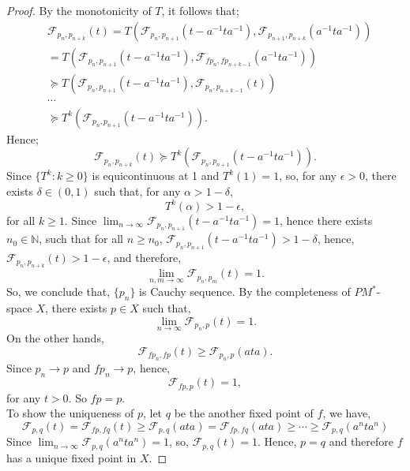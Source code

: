 \documentclass[10pt,a4paper]{amsart}
\begin{document}
\begin{proof}
	By the monotonicity of $T$, it follows that;
	\begin{align*}
		&\mathcal{F}_{p_{n},p_{n+k}}(t)=T\left( \mathcal{F}_{p_{n},p_{n+1}}(t-a^{-1}ta^{-1}), \mathcal{F}_{p_{n+1},p_{n+k}}(a^{-1}ta^{-1})\right) \\
		&=T\left( \mathcal{F}_{p_{n},p_{n+1}}(t-a^{-1}ta^{-1}), \mathcal{F}_{fp_{n},fp_{n+k-1}}(a^{-1}ta^{-1})\right) \\
		& \succeq T\left( \mathcal{F}_{p_{n},p_{n+1}}(t-a^{-1}ta^{-1}), \mathcal{F}_{p_{n},p_{n+k-1}}(t)\right) \\
		&\cdots\\
		& \succeq T^k\left( \mathcal{F}_{p_{n},p_{n+1}}(t-a^{-1}ta^{-1})\right).
	\end{align*}
	Hence;
	$$\mathcal{F}_{p_{n},p_{n+k}}(t)\succeq T^k\left( \mathcal{F}_{p_{n},p_{n+1}}(t-a^{-1}ta^{-1})\right).$$
	Since $\{T^k: k\geq0\}$ is equicontinuous at 1 and $T^k(1)=1$, so, for any $\epsilon>0$, there exists $\delta \in (0,1)$ such that, for any $\alpha> 1-\delta$,
	$$T^k(\alpha)>1-\epsilon,$$
	for all $k\geq 1$. Since $\lim_{n\to\infty}\mathcal{F}_{p_{n},p_{n+1}}(t-a^{-1}ta^{-1})=1$, hence there exists $n_0\in \mathbb{N}$, such that for all $n\geq n_0$, 
	$\mathcal{F}_{p_{n},p_{n+1}}(t-a^{-1}ta^{-1})>1-\delta$, hence, $\mathcal{F}_{p_{n},p_{n+k}}(t)>1-\epsilon$, and therefore,
	$$\lim_{n,m\to \infty}\mathcal{F}_{p_{n},p_{m}}(t)=1.$$
	So, we conclude that, $\{p_n\}$ is Cauchy sequence. By the completeness of $PM^*$-space $X$, there exists $p\in X$ such that, 
	$$\lim_{n\to \infty}\mathcal{F}_{p_{n},p}(t)=1.$$
	On the other hands,
	$$\mathcal{F}_{f{p_n},fp }(t)\geq \mathcal{F}_{p_n,p}(ata).$$
	Since $p_n\to p$ and $f{p_n}\to p$, hence,
	$$\mathcal{F}_{fp,p}(t)=1,$$
	for any $t>0$. So $fp=p$.\\
	To show the uniqueness of $p$, let $q$ be the another fixed point of $f$, we have, 
	$$\mathcal{F}_{p,q}(t)=\mathcal{F}_{fp,fq}(t)\geq\mathcal{F}_{p,q}(ata)= \mathcal{F}_{fp,fq}(ata)\geq \cdots \geq \mathcal{F}_{p,q}(a^nta^n)$$
	Since $\lim_{n\to \infty}\mathcal{F}_{p,q}(a^nta^n)=1$, so, $\mathcal{F}_{p,q}(t)=1$. Hence, $p=q$ and therefore $f$ has a unique fixed point in $X$.
\end{proof}
\end{document}

